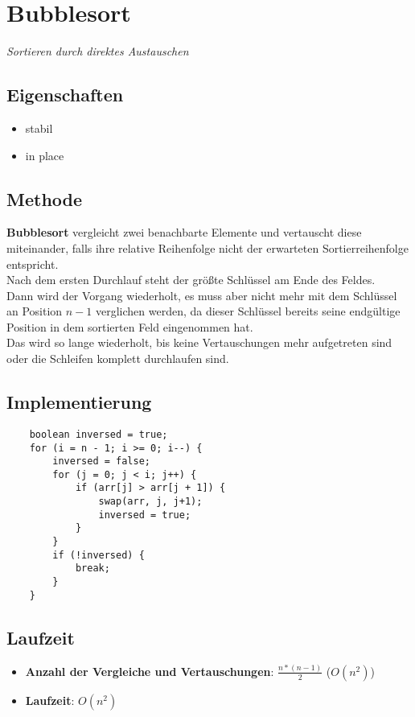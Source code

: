 \section{Bubblesort}

\textit{Sortieren durch direktes Austauschen}

\subsection{Eigenschaften}
\begin{itemize}
    \item stabil
    \item in place
\end{itemize}

\subsection{Methode}
\textbf{Bubblesort} vergleicht zwei benachbarte Elemente und vertauscht diese miteinander, falls ihre relative Reihenfolge nicht der erwarteten Sortierreihenfolge entspricht.\\
Nach dem ersten Durchlauf steht der größte  Schlüssel am Ende des Feldes.\\
Dann wird der Vorgang wiederholt, es muss aber nicht mehr mit dem Schlüssel an Position $n-1$ verglichen werden, da dieser Schlüssel bereits seine endgültige Position in dem sortierten Feld eingenommen hat.\\
Das wird so lange wiederholt, bis keine Vertauschungen mehr aufgetreten sind oder die Schleifen komplett durchlaufen sind.


\subsection{Implementierung}
\begin{verbatim}
    boolean inversed = true;
    for (i = n - 1; i >= 0; i--) {
        inversed = false;
        for (j = 0; j < i; j++) {
            if (arr[j] > arr[j + 1]) {
                swap(arr, j, j+1);
                inversed = true;
            }
        }
        if (!inversed) {
            break;
        }
    }
\end{verbatim}


\subsection{Laufzeit}
\begin{itemize}
    \item \textbf{Anzahl der Vergleiche und Vertauschungen}: $\frac{n * ( n - 1)}{2}$ ($O(n^2)$)
    \item \textbf{Laufzeit}: $O(n^2)$
\end{itemize}